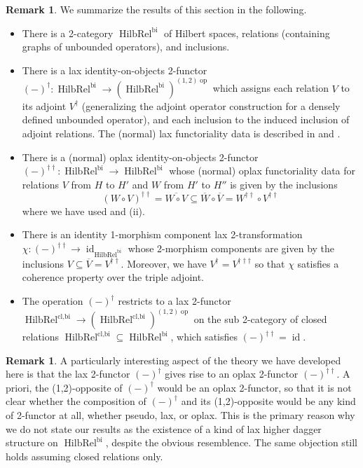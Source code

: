 \documentclass{article}
\newcommand{\opp}{\operatorname{op}}%
\newcommand{\id}{\operatorname{id}}%
\newcommand{\bi}{\operatorname{bi}}%
\newcommand{\HilbRel}{\operatorname{HilbRel}}%
\numberwithin{equation}{section}
\theoremstyle{definition}
\newtheorem{remark}[definition]{Remark}
\theoremstyle{theorem}
\begin{document}
\begin{remark}
    We summarize the results of this section in the following. 
    \begin{itemize}
        \item There is a 2-category $\HilbRel^{\bi}$ of Hilbert spaces, relations (containing graphs of unbounded operators), and inclusions. 
        \item There is a lax identity-on-objects 2-functor $(-)^\dagger \colon \HilbRel^{\bi} \to (\HilbRel^{\bi})^{(1,2)\opp}$ which 
        assigns each relation $V$ to its adjoint $V^\dagger$ (generalizing the adjoint operator construction for a densely defined unbounded operator), and each inclusion
        to the induced inclusion of adjoint relations. The (normal) lax functoriality data is described in  
        and .
        \item There is a (normal) oplax identity-on-objects 2-functor $(-)^{\dagger\dagger} \colon \HilbRel^{\bi} \to \HilbRel^{\bi}$ whose (normal) 
        oplax functoriality data for relations $V$ from $H$ to $H'$ and $W$ from $H'$ to $H''$ is given by the inclusions 
        \begin{equation}
            (W \circ V)^{\dagger \dagger} = \overline{W \circ V} \subseteq \overline{W} \circ \overline{V} = W^{\dagger \dagger} \circ V^{\dagger\dagger}
        \end{equation}
        where we have used  and  (ii).
        \item There is an identity 1-morphism component lax 2-transformation $\chi \colon (-)^{\dagger \dagger} \to \id_{\HilbRel^{\bi}}$ whose 2-morphism components are 
        given by the inclusions $V \subseteq \overline{V} = V^{\dagger \dagger}$. Moreover, we have $V^{\dagger} = V^{\dagger \dagger \dagger}$ so that 
        $\chi$ satisfies a coherence property over the triple adjoint. 
        \item The operation $(-)^{\dagger}$ restricts to a lax 2-functor $\HilbRel^{\text{cl,bi}} \to (\HilbRel^{\text{cl,bi}})^{(1,2)\opp}$ on the sub 2-category 
        of closed relations $\HilbRel^{\text{cl,bi}} \subseteq \HilbRel^{\text{bi}}$, which satisfies $(-)^{\dagger \dagger} = \id$. 
    \end{itemize}
\end{remark}
\begin{remark}
    A particularly interesting aspect of the theory we have developed here is that the lax 2-functor $(-)^\dagger$ gives rise to an oplax 2-functor 
    $(-)^{\dagger\dagger}$. A priori, the (1,2)-opposite of $(-)^\dagger$ would be an oplax 2-functor, so that it is not clear whether the composition 
    of $(-)^\dagger$ and its (1,2)-opposite would be any kind of 2-functor at all, whether pseudo, lax, or oplax. This is the primary reason why we 
    do not state our results as the existence of a kind of lax higher dagger structure on $\HilbRel^{\bi}$, despite the obvious resemblence. 
    The same objection still holds assuming closed relations only.
\end{remark}
\end{document}
